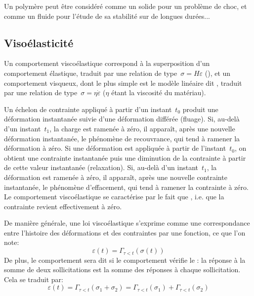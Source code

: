 Un polymère peut être considéré comme un solide pour un problème de choc, et comme un fluide pour l'étude de sa stabilité sur de longues durées...


\medskip
\subsection{Visoélasticité}

Un comportement viscoélastique correspond à la superposition d'un comportement élastique, traduit par une relation de type~$\sigma = H\varepsilon$ (), et un comportement visqueux, dont le plus simple est le modèle linéaire dit , traduit par une relation de type~$\sigma=\eta\dot{\varepsilon}$ ($\eta$ étant la viscosité du matériau).

\medskip
Un échelon de contrainte appliqué à partir d'un instant~$t_0$ produit une déformation instantanée suivie d'une déformation différée (fluage). Si, au-delà d'un instant~$t_1$, la charge est ramenée à zéro, il apparaît, après une nouvelle déformation instantanée, le phénomène de recouvrance, qui tend à ramener la déformation à zéro.
\medskipvm
Si une déformation est appliquée à partir de l'instant~$t_0$, on obtient une contrainte instantanée puis une diminution de la contrainte à partir de cette valeur instantanée (relaxation). Si, au-delà d'un instant~$t_1$, la déformation est ramenée à zéro, il apparaît, après une nouvelle contrainte instantanée, le phénomène d'effacement, qui tend à ramener la contrainte à zéro.
\medskipvm
Le comportement viscoélastique se caractérise par le fait que , i.e. que la contrainte revient effectivement à zéro.

\medskip
De manière générale, une loi viscoélastique s'exprime comme une correspondance entre l'histoire des déformations et des contraintes par une fonction, ce que l'on note:
\begin{equation} \varepsilon(t) =\Gamma_{\tau<t}(\sigma(t)) \end{equation}
De plus, le comportement sera dit  si le comportement vérifie le : la réponse à la somme de deux sollicitations est la somme des réponses à chaque sollicitation. Cela se traduit par:
\begin{equation} \varepsilon(t) = \Gamma_{\tau<t}(\sigma_1+\sigma_2) = \Gamma_{\tau<t}(\sigma_1)
+\Gamma_{\tau<t}(\sigma_2) \end{equation}


